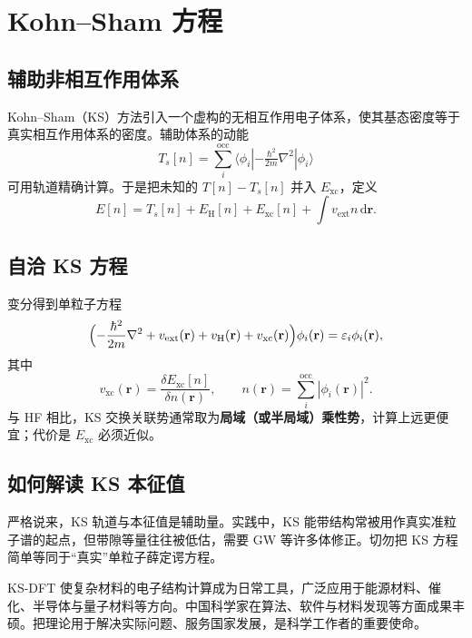 \section{Kohn--Sham 方程}

\subsection{辅助非相互作用体系}

Kohn--Sham（KS）方法引入一个虚构的无相互作用电子体系，使其基态密度等于真实相互作用体系的密度。辅助体系的动能
\begin{equation}
  T_s[n]=\sum_i^{\mathrm{occ}}
  \langle\phi_i|-\tfrac{\hbar^2}{2m}\nabla^2|\phi_i\rangle
\end{equation}
可用轨道精确计算。于是把未知的 $T[n]-T_s[n]$ 并入 $E_{\mathrm{xc}}$，定义
\begin{equation}
  E[n]
  =T_s[n]+E_{\mathrm{H}}[n]+E_{\mathrm{xc}}[n]
  +\int v_{\mathrm{ext}}n\,\mathrm{d}\mathbf{r}.
\end{equation}

\subsection{自洽 KS 方程}

变分得到单粒子方程
\begin{equation}
  \Bigl(
  -\frac{\hbar^2}{2m}\nabla^2
  +v_{\mathrm{ext}}(\mathbf{r})
  +v_{\mathrm{H}}(\mathbf{r})
  +v_{\mathrm{xc}}(\mathbf{r})
  \Bigr)\phi_i(\mathbf{r})
  =\varepsilon_i\phi_i(\mathbf{r}),
\end{equation}
其中
\begin{equation}
  v_{\mathrm{xc}}(\mathbf{r})
  =\frac{\delta E_{\mathrm{xc}}[n]}{\delta n(\mathbf{r})},
  \qquad
  n(\mathbf{r})=\sum_i^{\mathrm{occ}}|\phi_i(\mathbf{r})|^2.
\end{equation}
与 HF 相比，KS 交换关联势通常取为\textbf{局域（或半局域）乘性势}，计算上远更便宜；代价是 $E_{\mathrm{xc}}$ 必须近似。

\subsection{如何解读 KS 本征值}

严格说来，KS 轨道与本征值是辅助量。实践中，KS 能带结构常被用作真实准粒子谱的起点，但带隙等量往往被低估，需要 GW 等许多体修正。切勿把 KS 方程简单等同于“真实”单粒子薛定谔方程。

\begin{note}
KS-DFT 使复杂材料的电子结构计算成为日常工具，广泛应用于能源材料、催化、半导体与量子材料等方向。中国科学家在算法、软件与材料发现等方面成果丰硕。把理论用于解决实际问题、服务国家发展，是科学工作者的重要使命。
\end{note}
